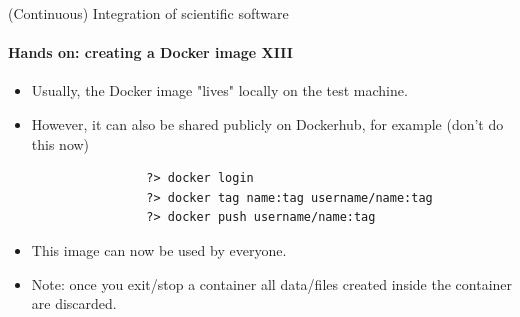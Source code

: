 \begin{frame}[fragile]{(Continuous) Integration of scientific software} 
    \framesubtitle{Hands on: creating a Docker image XIII} 
    \vfill

    \begin{itemize}
        \item Usually, the Docker image "lives" locally on the test machine. 
        \item However, it can also be shared publicly on Dockerhub, for example (don't do this now)

            \begin{verbatim}
                ?> docker login 
                ?> docker tag name:tag username/name:tag
                ?> docker push username/name:tag
            \end{verbatim}
        \item This image can now be used by everyone.
        \item Note: once you exit/stop a container all data/files created inside the container are discarded. 

    \end{itemize}

\end{frame}

